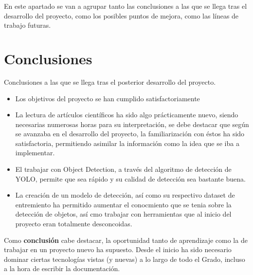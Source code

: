 
En este apartado se van a agrupar tanto las conclusiones a las que se llega tras el desarrollo del proyecto, como los posibles puntos de mejora, como las líneas de trabajo futuras.

\section{Conclusiones}
Conclusiones a las que se llega tras el posterior desarrollo del proyecto.
\begin{itemize}
    \item Los objetivos del proyecto se han cumplido satisfactoriamente
    \item La lectura de artículos científicos ha sido algo prácticamente nuevo, siendo necesarias numerosas horas para su interpretación, se debe destacar que según se avanzaba en el desarrollo del proyecto, la familiarización con éstos ha sido satisfactoria, permitiendo asimilar la información como la idea que se iba a implementar.
    \item El trabajar con Object Detection, a través del algoritmo de detección de YOLO, permite que sea rápido y su calidad de detección sea bastante buena.
    \item La creación de un modelo de detección, así como su respectivo dataset de entremiento ha permitido aumentar el conocmiento que se tenia sobre la detección de objetos, así cmo trabajar con herramientas que al inicio del proyecto eran totalmente desconcoidas. 
\end{itemize}

Como \textbf{conclusión} cabe destacar, la oportunidad tanto de aprendizaje como la de trabajar en un proyecto nuevo ha supuesto. Desde el inicio ha sido necesario dominar ciertas tecnologías vistas (y nuevas) a lo largo de todo el Grado, incluso a la hora de escribir la documentación.

